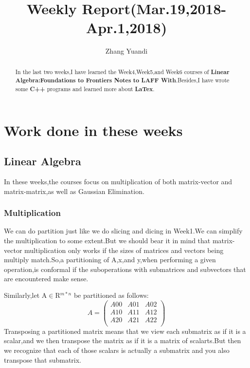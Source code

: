 \documentclass{article}
\title{Weekly Report(Mar.19,2018-Apr.1,2018)}
\author{Zhang Yuandi}
\begin{document}
\maketitle

\begin{abstract}
In the last two weeks,I have learned the Week4,Week5,and Week6 courses of \textbf{Linear Algebra:Foundations to Frontiers Notes to LAFF With}.Besides,I have wrote some \textbf{C++} programs and learned more about \textbf{LaTex}.  
\end{abstract}

\section{Work done in these weeks}

\subsection{Linear Algebra}

In these weeks,the courses focus on multiplication of both matrix-vector and matrix-matrix,as well as Gaussian Elimination.
\subsubsection{Multiplication}


We can do partition just like we do slicing and dicing in Week1.We can simplify the multiplication to some extent.But we should bear it in mind that matrix-vector multiplication only works if the sizes of matrices and vectors being multiply match.So,a partitioning of A,x,and y,when performing a given operation,is conformal if the suboperations with submatrices and subvectors that are encountered make sense.


Similarly,let A$\in$R$^{m*n}$ be partitioned as follows:
\begin{equation}  
A=\left(              
  \begin{array}{ccc} 
    A00 & A01 & A02\\ 
    A10 & A11 & A12\\ 
    A20 & A21 & A22\\
  \end{array}
\right) 
\end{equation}
Transposing a partitioned matrix means that we view each submatrix as if it is a scalar,and we then transpose the matrix as if it is a matrix of scalarts.But then we recognize that each of those scalars is actually a submatrix and you also transpose that submatrix.
\end{document}
